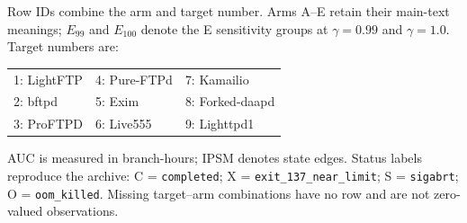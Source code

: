 \begingroup
\small
\setlength{\tabcolsep}{1.6pt}
\renewcommand{\arraystretch}{1.0}
\noindent Row IDs combine the arm and target number. Arms A--E retain their main-text meanings; $E_{99}$ and $E_{100}$ denote the E sensitivity groups at $\gamma=0.99$ and $\gamma=1.0$. Target numbers are:
\par\smallskip
\noindent\begin{tabularx}{\columnwidth}{@{}YYY@{}}
1: LightFTP & 4: Pure-FTPd & 7: Kamailio \\
2: bftpd & 5: Exim & 8: Forked-daapd \\
3: ProFTPD & 6: Live555 & 9: Lighttpd1 \\
\end{tabularx}
\par\smallskip
\noindent AUC is measured in branch-hours; IPSM denotes state edges. Status labels reproduce the archive: C = \texttt{completed}; X = \texttt{exit\_137\_near\_limit}; S = \texttt{sigabrt}; O = \texttt{oom\_killed}. Missing target--arm combinations have no row and are not zero-valued observations.
\par\smallskip
{}\label{tab:archive_arms}
\tabletail{\bottomrule}
\tablelasttail{\bottomrule}
